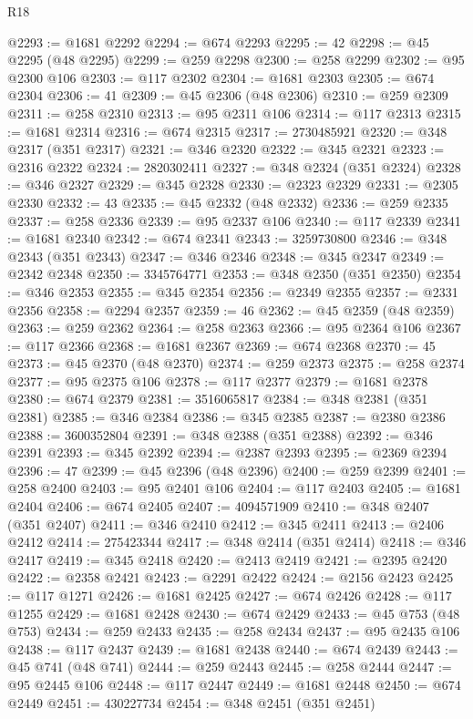 \begin{lexlean}{R18}
\begin{coremodule}
@2293 := @1681 @2292
@2294 := @674 @2293
@2295 := 42
@2298 := @45 @2295 (@48 @2295)
@2299 := @259 @2298
@2300 := @258 @2299
@2302 := @95 @2300 @106
@2303 := @117 @2302
@2304 := @1681 @2303
@2305 := @674 @2304
@2306 := 41
@2309 := @45 @2306 (@48 @2306)
@2310 := @259 @2309
@2311 := @258 @2310
@2313 := @95 @2311 @106
@2314 := @117 @2313
@2315 := @1681 @2314
@2316 := @674 @2315
@2317 := 2730485921
@2320 := @348 @2317 (@351 @2317)
@2321 := @346 @2320
@2322 := @345 @2321
@2323 := @2316 @2322
@2324 := 2820302411
@2327 := @348 @2324 (@351 @2324)
@2328 := @346 @2327
@2329 := @345 @2328
@2330 := @2323 @2329
@2331 := @2305 @2330
@2332 := 43
@2335 := @45 @2332 (@48 @2332)
@2336 := @259 @2335
@2337 := @258 @2336
@2339 := @95 @2337 @106
@2340 := @117 @2339
@2341 := @1681 @2340
@2342 := @674 @2341
@2343 := 3259730800
@2346 := @348 @2343 (@351 @2343)
@2347 := @346 @2346
@2348 := @345 @2347
@2349 := @2342 @2348
@2350 := 3345764771
@2353 := @348 @2350 (@351 @2350)
@2354 := @346 @2353
@2355 := @345 @2354
@2356 := @2349 @2355
@2357 := @2331 @2356
@2358 := @2294 @2357
@2359 := 46
@2362 := @45 @2359 (@48 @2359)
@2363 := @259 @2362
@2364 := @258 @2363
@2366 := @95 @2364 @106
@2367 := @117 @2366
@2368 := @1681 @2367
@2369 := @674 @2368
@2370 := 45
@2373 := @45 @2370 (@48 @2370)
@2374 := @259 @2373
@2375 := @258 @2374
@2377 := @95 @2375 @106
@2378 := @117 @2377
@2379 := @1681 @2378
@2380 := @674 @2379
@2381 := 3516065817
@2384 := @348 @2381 (@351 @2381)
@2385 := @346 @2384
@2386 := @345 @2385
@2387 := @2380 @2386
@2388 := 3600352804
@2391 := @348 @2388 (@351 @2388)
@2392 := @346 @2391
@2393 := @345 @2392
@2394 := @2387 @2393
@2395 := @2369 @2394
@2396 := 47
@2399 := @45 @2396 (@48 @2396)
@2400 := @259 @2399
@2401 := @258 @2400
@2403 := @95 @2401 @106
@2404 := @117 @2403
@2405 := @1681 @2404
@2406 := @674 @2405
@2407 := 4094571909
@2410 := @348 @2407 (@351 @2407)
@2411 := @346 @2410
@2412 := @345 @2411
@2413 := @2406 @2412
@2414 := 275423344
@2417 := @348 @2414 (@351 @2414)
@2418 := @346 @2417
@2419 := @345 @2418
@2420 := @2413 @2419
@2421 := @2395 @2420
@2422 := @2358 @2421
@2423 := @2291 @2422
@2424 := @2156 @2423
@2425 := @117 @1271
@2426 := @1681 @2425
@2427 := @674 @2426
@2428 := @117 @1255
@2429 := @1681 @2428
@2430 := @674 @2429
@2433 := @45 @753 (@48 @753)
@2434 := @259 @2433
@2435 := @258 @2434
@2437 := @95 @2435 @106
@2438 := @117 @2437
@2439 := @1681 @2438
@2440 := @674 @2439
@2443 := @45 @741 (@48 @741)
@2444 := @259 @2443
@2445 := @258 @2444
@2447 := @95 @2445 @106
@2448 := @117 @2447
@2449 := @1681 @2448
@2450 := @674 @2449
@2451 := 430227734
@2454 := @348 @2451 (@351 @2451)

\end{coremodule}
\end{lexlean}
